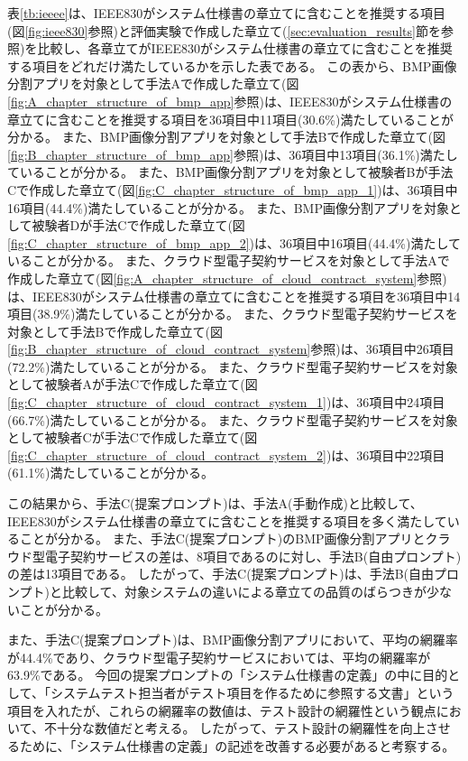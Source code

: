 表\ref{tb:ieeee}は、IEEE830がシステム仕様書の章立てに含むことを推奨する項目(図\ref{fig:ieee830}参照)と評価実験で作成した章立て(\ref{sec:evaluation_results}節を参照)を比較し、各章立てがIEEE830がシステム仕様書の章立てに含むことを推奨する項目をどれだけ満たしているかを示した表である。
この表から、BMP画像分割アプリを対象として手法Aで作成した章立て(図\ref{fig:A_chapter_structure_of_bmp_app}参照)は、IEEE830がシステム仕様書の章立てに含むことを推奨する項目を36項目中11項目(30.6\%)満たしていることが分かる。
また、BMP画像分割アプリを対象として手法Bで作成した章立て(図\ref{fig:B_chapter_structure_of_bmp_app}参照)は、36項目中13項目(36.1\%)満たしていることが分かる。
また、BMP画像分割アプリを対象として被験者Bが手法Cで作成した章立て(図\ref{fig:C_chapter_structure_of_bmp_app_1})は、36項目中16項目(44.4\%)満たしていることが分かる。
また、BMP画像分割アプリを対象として被験者Dが手法Cで作成した章立て(図\ref{fig:C_chapter_structure_of_bmp_app_2})は、36項目中16項目(44.4\%)満たしていることが分かる。
また、クラウド型電子契約サービスを対象として手法Aで作成した章立て(図\ref{fig:A_chapter_structure_of_cloud_contract_system}参照)は、IEEE830がシステム仕様書の章立てに含むことを推奨する項目を36項目中14項目(38.9\%)満たしていることが分かる。
また、クラウド型電子契約サービスを対象として手法Bで作成した章立て(図\ref{fig:B_chapter_structure_of_cloud_contract_system}参照)は、36項目中26項目(72.2\%)満たしていることが分かる。
また、クラウド型電子契約サービスを対象として被験者Aが手法Cで作成した章立て(図\ref{fig:C_chapter_structure_of_cloud_contract_system_1})は、36項目中24項目(66.7\%)満たしていることが分かる。
また、クラウド型電子契約サービスを対象として被験者Cが手法Cで作成した章立て(図\ref{fig:C_chapter_structure_of_cloud_contract_system_2})は、36項目中22項目(61.1\%)満たしていることが分かる。

この結果から、手法C(提案プロンプト)は、手法A(手動作成)と比較して、IEEE830がシステム仕様書の章立てに含むことを推奨する項目を多く満たしていることが分かる。
また、手法C(提案プロンプト)のBMP画像分割アプリとクラウド型電子契約サービスの差は、8項目であるのに対し、手法B(自由プロンプト)の差は13項目である。
したがって、手法C(提案プロンプト)は、手法B(自由プロンプト)と比較して、対象システムの違いによる章立ての品質のばらつきが少ないことが分かる。

また、手法C(提案プロンプト)は、BMP画像分割アプリにおいて、平均の網羅率が44.4\%であり、クラウド型電子契約サービスにおいては、平均の網羅率が63.9\%である。
今回の提案プロンプトの「システム仕様書の定義」の中に目的として、「システムテスト担当者がテスト項目を作るために参照する文書」という項目を入れたが、これらの網羅率の数値は、テスト設計の網羅性という観点において、不十分な数値だと考える。
したがって、テスト設計の網羅性を向上させるために、「システム仕様書の定義」の記述を改善する必要があると考察する。

